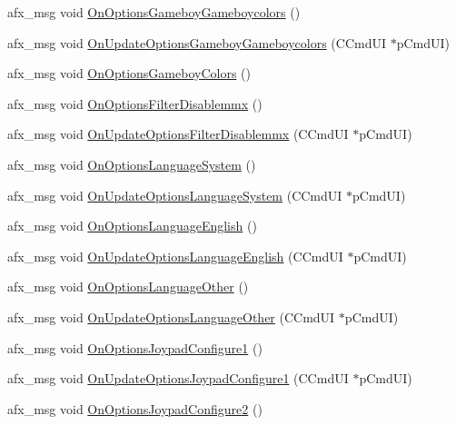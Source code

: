 \begin{DoxyCompactItemize}
\item 
afx\+\_\+msg void \mbox{\hyperlink{class_main_wnd_a50303dd10fbc876ddb67642295664d50}{On\+Options\+Gameboy\+Gameboycolors}} ()
\item 
afx\+\_\+msg void \mbox{\hyperlink{class_main_wnd_afc1d1c793e24da9855d3dfc0d37fcaaf}{On\+Update\+Options\+Gameboy\+Gameboycolors}} (C\+Cmd\+UI $\ast$p\+Cmd\+UI)
\item 
afx\+\_\+msg void \mbox{\hyperlink{class_main_wnd_a26f32c1e841c679d112a15f00db1d9b2}{On\+Options\+Gameboy\+Colors}} ()
\item 
afx\+\_\+msg void \mbox{\hyperlink{class_main_wnd_aec2034cf5c7ea0ff74b1f81cd29a5e10}{On\+Options\+Filter\+Disablemmx}} ()
\item 
afx\+\_\+msg void \mbox{\hyperlink{class_main_wnd_a8399bcb846d0d5d0fe3d28e8a8232af9}{On\+Update\+Options\+Filter\+Disablemmx}} (C\+Cmd\+UI $\ast$p\+Cmd\+UI)
\item 
afx\+\_\+msg void \mbox{\hyperlink{class_main_wnd_a9e8eaf3488f32697f695789cb89a7dce}{On\+Options\+Language\+System}} ()
\item 
afx\+\_\+msg void \mbox{\hyperlink{class_main_wnd_a4f8798fc51757dbdff7f0b2bd7e93a82}{On\+Update\+Options\+Language\+System}} (C\+Cmd\+UI $\ast$p\+Cmd\+UI)
\item 
afx\+\_\+msg void \mbox{\hyperlink{class_main_wnd_a611b1bde0b2a2ca47ace63d4dec8c27a}{On\+Options\+Language\+English}} ()
\item 
afx\+\_\+msg void \mbox{\hyperlink{class_main_wnd_a4c2148b6e984eadb4bc8e16f43d720dc}{On\+Update\+Options\+Language\+English}} (C\+Cmd\+UI $\ast$p\+Cmd\+UI)
\item 
afx\+\_\+msg void \mbox{\hyperlink{class_main_wnd_a49362710ce41db0c6afc8e8bf529ea4d}{On\+Options\+Language\+Other}} ()
\item 
afx\+\_\+msg void \mbox{\hyperlink{class_main_wnd_a253ed6fa2a8e7f58b8ad1fce6b45f70e}{On\+Update\+Options\+Language\+Other}} (C\+Cmd\+UI $\ast$p\+Cmd\+UI)
\item 
afx\+\_\+msg void \mbox{\hyperlink{class_main_wnd_af3ee3cb477d6492d5a548cf41ad1b16f}{On\+Options\+Joypad\+Configure1}} ()
\item 
afx\+\_\+msg void \mbox{\hyperlink{class_main_wnd_a286f4a4cb4a6cfba840645853ab7132c}{On\+Update\+Options\+Joypad\+Configure1}} (C\+Cmd\+UI $\ast$p\+Cmd\+UI)
\item 
afx\+\_\+msg void \mbox{\hyperlink{class_main_wnd_afb2b65a9fbb1b37c10b73c1752b94f4e}{On\+Options\+Joypad\+Configure2}} ()
\item 

\end{DoxyCompactItemize}
